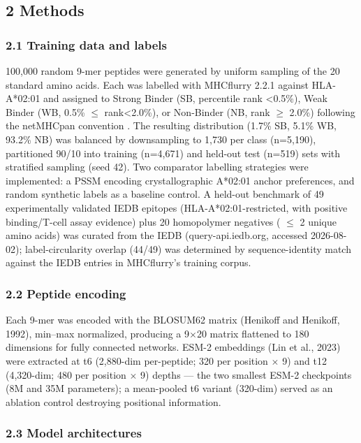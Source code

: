 \documentclass[10pt]{article}
\begin{document}
\subsection{2 Methods}\label{methods}

\subsubsection{2.1 Training data and
labels}\label{training-data-and-labels}

100,000 random 9-mer peptides were generated by uniform sampling of the
20 standard amino acids. Each was labelled with MHCflurry 2.2.1 against
HLA-A*02:01 and assigned to Strong Binder (SB, percentile rank
\textless0.5\%), Weak Binder (WB, 0.5\% $\leq$ rank\textless2.0\%), or
Non-Binder (NB, rank  $\geq$ 2.0\%) following the netMHCpan convention
\cite{Reynisson20}. The resulting distribution (1.7\% SB, 5.1\%
WB, 93.2\% NB) was balanced by downsampling to 1,730 per class
(n=5,190), partitioned 90/10 into training (n=4,671) and held-out test
(n=519) sets with stratified sampling (seed 42). Two comparator
labelling strategies were implemented: a PSSM encoding crystallographic
A*02:01 anchor preferences, and random synthetic labels as a baseline
control. A held-out benchmark of 49 experimentally validated IEDB
epitopes (HLA-A*02:01-restricted, with positive binding/T-cell assay
evidence) plus 20 homopolymer negatives ( $\leq$ 2 unique amino acids) was
curated from the IEDB (query-api.iedb.org, accessed 2026-08-02);
label-circularity overlap (44/49) was determined by sequence-identity
match against the IEDB entries in MHCflurry's training corpus.

\subsubsection{2.2 Peptide encoding}\label{peptide-encoding}

Each 9-mer was encoded with the BLOSUM62 matrix (Henikoff and Henikoff,
1992), min--max normalized, producing a 9$\times$20 matrix flattened to 180
dimensions for fully connected networks. ESM-2 embeddings (Lin et al.,
2023) were extracted at t6 (2,880-dim per-peptide; 320 per position $\times$ 9)
and t12 (4,320-dim; 480 per position $\times$ 9) depths --- the two smallest
ESM-2 checkpoints (8M and 35M parameters); a mean-pooled t6 variant
(320-dim) served as an ablation control destroying positional
information.

\subsubsection{2.3 Model architectures}\label{model-architectures}
\end{document}
